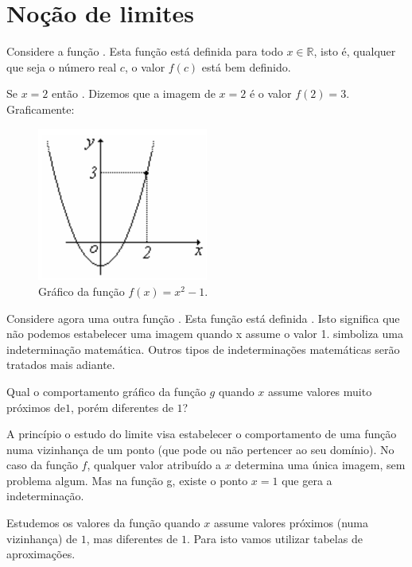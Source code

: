 \cleardoublepage\documentclass[../main.tex]{subfiles}
\begin{document}
\section{Noção de limites}\hypertarget{NocaoLimite}{}\label{sec:limites}
Considere a função . Esta função está definida para todo $x\in\mathbb{R}$, isto é, qualquer que seja o número real $c$, o valor $f (c)$ está bem definido.
\begin{ex}
  Se $x = 2$ então  . Dizemos que a imagem de $x = 2$ é o valor $f (2) = 3 $.\\
Graficamente:
\begin{figure}[H]
  \centering
  \includegraphics[width=0.5\textwidth]{fig_lim/fig_int_lim}
  \caption{Gráfico da função $f(x)=x^2-1$.}
  \label{fig:func+_x^2-1}
\end{figure}
\end{ex}

Considere agora uma outra função . Esta função está definida
. Isto significa que não podemos estabelecer uma imagem quando x assume o valor 1.
 simboliza uma indeterminação matemática. Outros tipos de indeterminações matemáticas serão tratados mais adiante.

Qual o comportamento gráfico da função $g$ quando $x$ assume valores muito próximos de$1$, porém
diferentes de $1$?

A princípio o estudo do limite visa estabelecer o comportamento de uma função numa vizinhança de um ponto (que pode ou não pertencer ao seu domínio). No caso da função $f$, qualquer valor atribuído a $x$ determina uma única imagem, sem problema algum. Mas na função g, existe o ponto $x = 1$ que gera a indeterminação.

Estudemos os valores da função  quando $x$ assume valores próximos
(numa vizinhança) de $1$, mas diferentes de $1$. Para isto vamos utilizar tabelas de aproximações.
\end{document}
